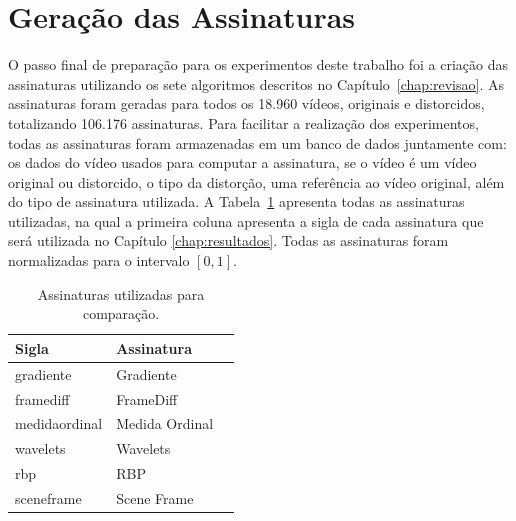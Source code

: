 \section{Geração das Assinaturas}
\label{sec:met-assinaturas}

O passo final de preparação para os experimentos deste trabalho foi a criação das assinaturas utilizando os sete algoritmos descritos no Capítulo~\ref{chap:revisao}. As assinaturas foram geradas para todos os 18.960 vídeos, originais e distorcidos, totalizando 106.176 assinaturas. Para facilitar a realização dos experimentos, todas as assinaturas foram armazenadas em um banco de dados juntamente com: os dados do vídeo usados para computar a assinatura, se o vídeo é um vídeo original ou distorcido, o tipo da distorção, uma referência ao vídeo original, além do tipo de assinatura utilizada. A Tabela~\ref{tab:assinaturas} apresenta todas as assinaturas utilizadas, na qual a primeira coluna apresenta a sigla de cada assinatura que será utilizada no Capítulo \ref{chap:resultados}. Todas as assinaturas foram normalizadas para o intervalo $[0,1]$.


\begin{table}[h]
    \centering
    \caption{Assinaturas utilizadas para comparação.}
    \label{tab:assinaturas}
    \begin{tabular}{|p{}|p{}|p{}|} \hline
        \textbf{Sigla} & \textbf{Assinatura} \\ \hline
        gradiente & Gradiente \\ \hline
        framediff & FrameDiff \\ \hline
        medidaordinal & Medida Ordinal \\ \hline
        wavelets & Wavelets \\ \hline
        rbp & RBP \\ \hline
        sceneframe & Scene Frame \\ \hline
    \end{tabular}
\end{table}


